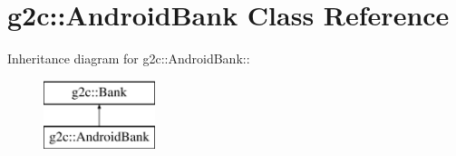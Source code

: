 \hypertarget{classg2c_1_1_android_bank}{
\section{g2c::AndroidBank Class Reference}
\label{classg2c_1_1_android_bank}
}
Inheritance diagram for g2c::AndroidBank::\begin{figure}[H]
\begin{center}
\leavevmode
\includegraphics[height=2cm]{classg2c_1_1_android_bank}
\end{center}
\end{figure}
